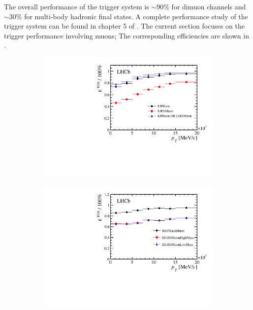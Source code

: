 The overall performance of the \lhcb trigger system is $\sim 90\%$ for dimuon channels and $\sim 30\%$ for
multi-body hadronic final states. A complete performance study of the trigger system can be found in chapter
5 of \cite{Aaij:2014jba}. The current section focuses on the trigger performance involving muons;
The corresponding efficiencies are shown in .


\begin{figure}[t]
  \centering
  \begin{subfigure}{0.5\textwidth}
    \raggedright
    \includegraphics[width=\textwidth,trim=0.45cm 0cm 0.4cm 0cm, clip=true]{Figures/Chapter2/l0_muon_eff}
    \caption{}
    \label{det_run_one_l0_muon_line_eff}
  \end{subfigure}%
  \begin{subfigure}{0.5\textwidth}
    \raggedleft
    \includegraphics[width=\textwidth,trim=0.45cm 0cm 0.4cm 0cm, clip=true]{Figures/Chapter2/hlt1_muon_eff}

\end{subfigure}
\end{figure}

